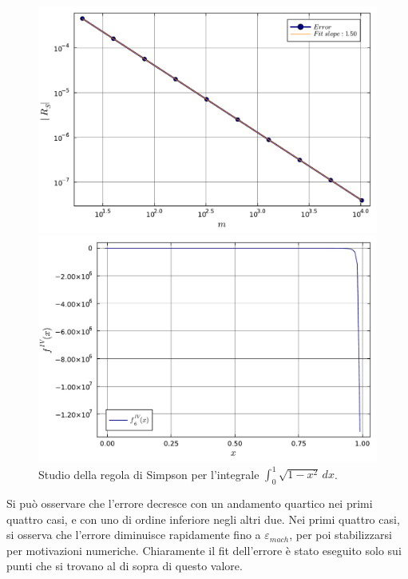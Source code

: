 \documentclass[letterpaper, 12pt]{article}
\numberwithin{equation}{section}    %
\begin{document}
\begin{figure}[!ht]
    \centering
    \begin{minipage}[b]{0.47\textwidth}
        \includegraphics[width=\textwidth]{5146.pdf}
    \end{minipage}
    \hspace{0.5cm}
    \begin{minipage}[b]{0.47\textwidth}
        \includegraphics[width=\textwidth]{5146_2.pdf}
    \end{minipage}
    \caption{Studio della regola di Simpson per l'integrale $\int_0^1 \sqrt{1-x^2}\, dx$.}
    \label{fig:es5_1_4_6}
\end{figure}

Si può osservare che l'errore decresce con un andamento quartico nei primi quattro casi, e con uno di ordine 
inferiore negli altri due. Nei primi quattro casi, si osserva che l'errore diminuisce rapidamente
fino a $\varepsilon_{mach}$, per poi stabilizzarsi per motivazioni numeriche. Chiaramente il fit
dell'errore è stato eseguito solo sui punti che si trovano al di sopra di questo valore.
\end{document}
